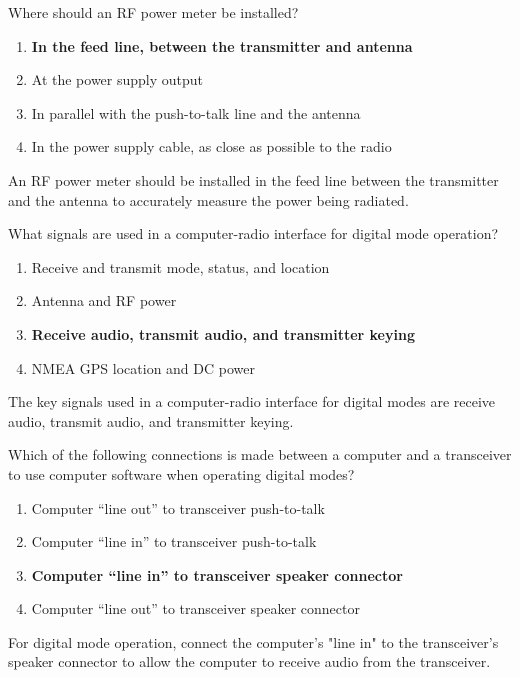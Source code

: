 \begin{tcolorbox}[colback=gray!10!white,colframe=black!75!black,title={T4A05}]
    Where should an RF power meter be installed?
    \begin{enumerate}[label=\Alph*),noitemsep]
        \item \textbf{In the feed line, between the transmitter and antenna}
        \item At the power supply output
        \item In parallel with the push-to-talk line and the antenna
        \item In the power supply cable, as close as possible to the radio
    \end{enumerate}
\end{tcolorbox}
An RF power meter should be installed in the feed line between the transmitter and the antenna to accurately measure the power being radiated.

\begin{tcolorbox}[colback=gray!10!white,colframe=black!75!black,title={T4A06}]
    What signals are used in a computer-radio interface for digital mode operation?
    \begin{enumerate}[label=\Alph*),noitemsep]
        \item Receive and transmit mode, status, and location
        \item Antenna and RF power
        \item \textbf{Receive audio, transmit audio, and transmitter keying}
        \item NMEA GPS location and DC power
    \end{enumerate}
\end{tcolorbox}
The key signals used in a computer-radio interface for digital modes are receive audio, transmit audio, and transmitter keying.

\begin{tcolorbox}[colback=gray!10!white,colframe=black!75!black,title={T4A07}]
    Which of the following connections is made between a computer and a transceiver to use computer software when operating digital modes?
    \begin{enumerate}[label=\Alph*),noitemsep]
        \item Computer “line out” to transceiver push-to-talk
        \item Computer “line in” to transceiver push-to-talk
        \item \textbf{Computer “line in” to transceiver speaker connector}
        \item Computer “line out” to transceiver speaker connector
    \end{enumerate}
\end{tcolorbox}
For digital mode operation, connect the computer's "line in" to the transceiver's speaker connector to allow the computer to receive audio from the transceiver.


